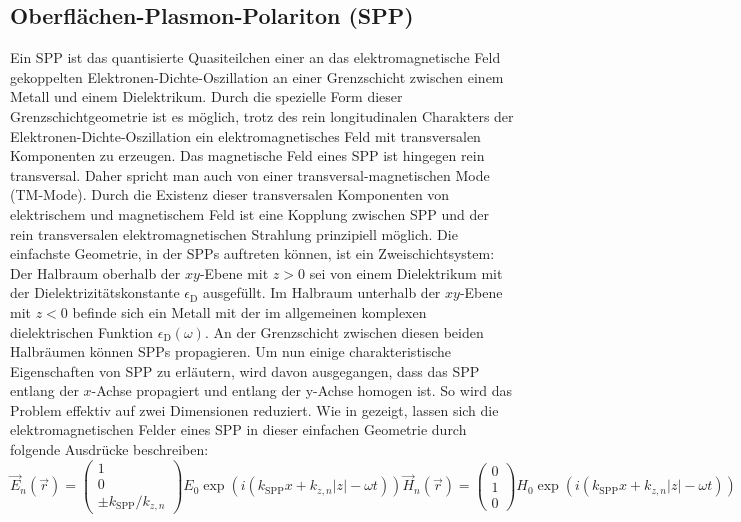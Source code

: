 \documentclass[titlepage,  ngerman]{article}
\begin{document}
	\subsection{Oberflächen-Plasmon-Polariton (SPP)}
	\label{sec:spp}		
	Ein SPP ist das quantisierte Quasiteilchen einer an das elektromagnetische Feld gekoppelten Elektronen-Dichte-Oszillation an einer Grenzschicht zwischen einem Metall und einem Dielektrikum. Durch die spezielle Form dieser Grenzschichtgeometrie ist es möglich, trotz des rein longitudinalen Charakters der Elektronen-Dichte-Oszillation ein elektromagnetisches Feld mit transversalen Komponenten zu erzeugen. Das magnetische Feld eines SPP ist hingegen rein transversal. Daher spricht man auch von einer transversal-magnetischen Mode (TM-Mode). Durch die Existenz dieser transversalen Komponenten von elektrischem und magnetischem Feld ist eine Kopplung zwischen SPP und der rein transversalen elektromagnetischen Strahlung prinzipiell möglich. Die einfachste Geometrie, in der SPPs auftreten können, ist ein Zweischichtsystem: Der Halbraum oberhalb der $xy$-Ebene mit $z>0$ sei von einem Dielektrikum mit der Dielektrizitätskonstante $\epsilon_\mathrm{D}$ ausgefüllt. Im Halbraum unterhalb der $xy$-Ebene mit $z<0$ befinde sich ein Metall mit der im allgemeinen komplexen dielektrischen Funktion $\epsilon_\mathrm{D}(\omega)$. An der Grenzschicht zwischen diesen beiden Halbräumen können SPPs propagieren. Um nun einige charakteristische Eigenschaften von SPP zu erläutern, wird davon ausgegangen, dass das SPP entlang der $x$-Achse propagiert und entlang der y-Achse homogen ist. So wird das Problem effektiv auf zwei Dimensionen reduziert. Wie in \cite{Maier.2007} gezeigt, lassen sich die elektromagnetischen Felder eines SPP in dieser einfachen Geometrie durch folgende Ausdrücke beschreiben:
	\begin{subequations}
		\label{eq:fields_spp}
		\begin{equation}
			\label{eq:electric_field_spp}
			\vec{E}_n(\vec{r}) = \begin{pmatrix} 1 \\ 0 \\ \pm k_{\mathrm{SPP}}/k_{z,n} \end{pmatrix} E_0 \exp\left(i(k_{\mathrm{SPP}}x + k_{z, n}|z|-\omega t)\right)	
		\end{equation}
		\begin{equation}
			\label{eq:magnetic_field_spp}
			\vec{H}_n(\vec{r}) = \begin{pmatrix} 0 \\ 1 \\ 0 \end{pmatrix} H_0 \exp\left(i(k_{\mathrm{SPP}}x + k_{z, n}|z|-\omega t)\right)
		\end{equation}
	\end{subequations}
\end{document}
